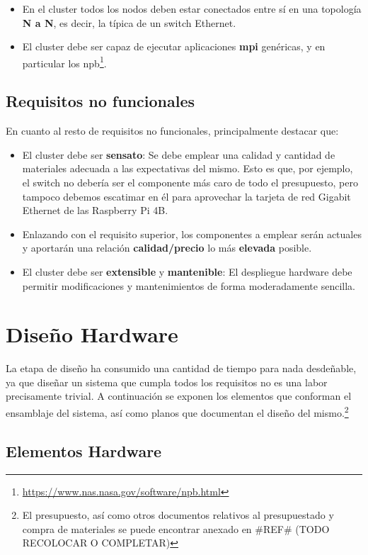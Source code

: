 \begin{itemize}
    \item En el cluster todos los nodos deben estar conectados entre sí en una topología \textbf{N a N}, es decir, la típica de un switch Ethernet.
    \item El cluster debe ser capaz de ejecutar aplicaciones \textbf{\acrshort{mpi}} genéricas, y en particular los \acrlong{npb}\footnote{\url{https://www.nas.nasa.gov/software/npb.html}}.
\end{itemize}

\subsection{Requisitos no funcionales}
En cuanto al resto de requisitos no funcionales, principalmente destacar que:
\begin{itemize}
    \item El cluster debe ser \textbf{sensato}: Se debe emplear una calidad y cantidad de materiales adecuada a las expectativas del mismo. Esto es que, por ejemplo, el switch no debería ser el componente más caro de todo el presupuesto, pero tampoco debemos escatimar en él para aprovechar la tarjeta de red Gigabit Ethernet de las Raspberry Pi 4B.
    \item Enlazando con el requisito superior, los componentes a emplear serán actuales y aportarán una relación \textbf{calidad/precio} lo más \textbf{elevada} posible.
    \item El cluster debe ser \textbf{extensible} y \textbf{mantenible}: El despliegue hardware debe permitir modificaciones y mantenimientos de forma moderadamente sencilla.
\end{itemize}

\section{Diseño Hardware}
\label{sec:diseño_hardware}
La etapa de diseño ha consumido una cantidad de tiempo para nada desdeñable, ya que diseñar un sistema que cumpla todos los requisitos no es una labor precisamente trivial. A continuación se exponen los elementos que conforman el ensamblaje del sistema, así como planos que documentan el diseño del mismo.\footnote{El presupuesto, así como otros documentos relativos al presupuestado y compra de materiales se puede encontrar anexado en \#REF\# (TODO RECOLOCAR O COMPLETAR)}

\subsection{Elementos Hardware}

